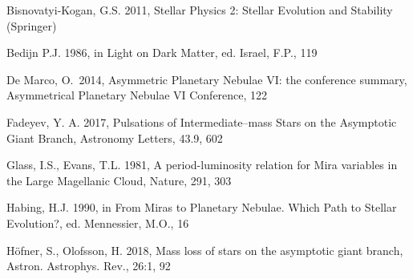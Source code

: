 \documentclass[a4paper,11pt]{article}
\begin{document}
\begin{thebibliography}{9}
    
    Bisnovatyi-Kogan, G.S. 2011, Stellar Physics 2: Stellar Evolution and Stability (Springer)
    

    Bedijn P.J. 1986, in Light on Dark Matter, ed. Israel, F.P., 119


     De Marco, O.\ 2014, Asymmetric Planetary Nebulae VI: the conference summary, Asymmetrical Planetary Nebulae VI Conference, 122

    Fadeyev, Y. A. 2017, Pulsations of Intermediate–mass Stars on the Asymptotic Giant Branch,  Astronomy Letters, 43.9, 602


    Glass, I.S., Evans, T.L. 1981, A period-luminosity relation for Mira variables in the Large Magellanic Cloud, Nature, 291, 303

    Habing, H.J. 1990, in From Miras to Planetary Nebulae. Which Path to Stellar Evolution?, ed. Mennessier, M.O., 16 

    Höfner, S., Olofsson, H. 2018, Mass loss of stars on the asymptotic giant branch, Astron. Astrophys. Rev., 26:1, 92



\end{thebibliography}
\end{document}
